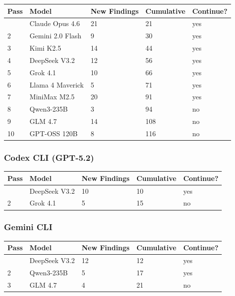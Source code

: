 \documentclass[
]{article}
\begin{document}
\begin{longtable}[]{@{}lllll@{}}
\toprule\noalign{}
Pass & Model & New Findings & Cumulative & Continue? \\
\midrule\noalign{}
\endhead
\bottomrule\noalign{}
\endlastfoot
1 & Claude Opus 4.6 & 21 & 21 & yes \\
2 & Gemini 2.0 Flash & 9 & 30 & yes \\
3 & Kimi K2.5 & 14 & 44 & yes \\
4 & DeepSeek V3.2 & 12 & 56 & yes \\
5 & Grok 4.1 & 10 & 66 & yes \\
6 & Llama 4 Maverick & 5 & 71 & yes \\
7 & MiniMax M2.5 & 20 & 91 & yes \\
8 & Qwen3-235B & 3 & 94 & no \\
9 & GLM 4.7 & 14 & 108 & no \\
10 & GPT-OSS 120B & 8 & 116 & no \\
\end{longtable}

\hypertarget{codex-cli-gpt-5.2}{%
\subsubsection{Codex CLI (GPT-5.2)}\label{codex-cli-gpt-5.2}}

\begin{longtable}[]{@{}lllll@{}}
\toprule\noalign{}
Pass & Model & New Findings & Cumulative & Continue? \\
\midrule\noalign{}
\endhead
\bottomrule\noalign{}
\endlastfoot
1 & DeepSeek V3.2 & 10 & 10 & yes \\
2 & Grok 4.1 & 5 & 15 & no \\
\end{longtable}

\hypertarget{gemini-cli}{%
\subsubsection{Gemini CLI}\label{gemini-cli}}

\begin{longtable}[]{@{}lllll@{}}
\toprule\noalign{}
Pass & Model & New Findings & Cumulative & Continue? \\
\midrule\noalign{}
\endhead
\bottomrule\noalign{}
\endlastfoot
1 & DeepSeek V3.2 & 12 & 12 & yes \\
2 & Qwen3-235B & 5 & 17 & yes \\
3 & GLM 4.7 & 4 & 21 & no \\
\end{longtable}
\end{document}
